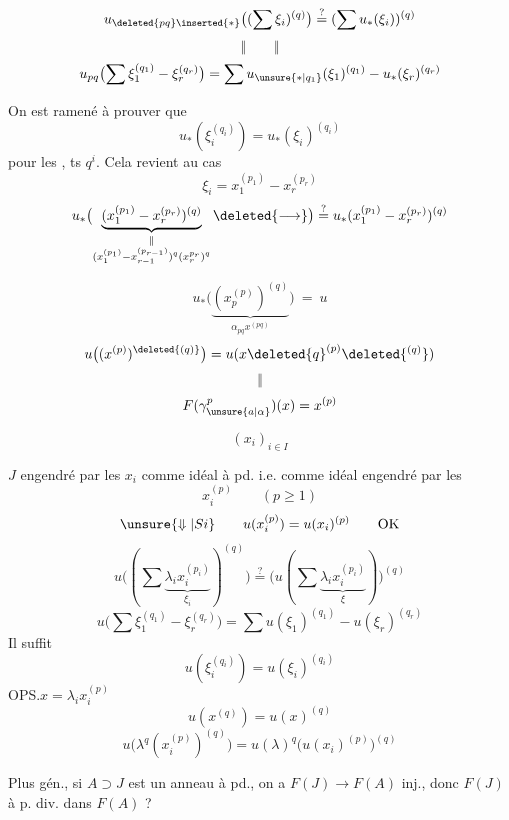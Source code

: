 
\[
u_{\deleted{pq}\inserted{*}}\bigl((\sum\xi_i)^{(q)}\bigr)
\overset{?}{=}(\sum u_*(\xi_i))^{(q)}
\]
\[\Vert\qquad\Vert\]
\[
u_{pq}\bigl(\sum\xi_1^{(q_1)}-\xi_r^{(q_r)}\bigr)
=\sum u_{\unsure{*|q_1}}(\xi_1)^{(q_1)}-u_*(\xi_r)^{(q_r)}
\]

On est ramené à prouver que
\[
u_*(\xi_i^{(q_i)})=u_*(\xi_i)^{(q_i)}
\]
pour les , ts $q^i$.
Cela revient au cas
\[
\xi_i=x_1^{(p_1)}-x_r^{(p_r)}
\]
\[
u_*\bigl(\underbrace{(x_1^{(p_1)}-x_r^{(p_r)})^{(q)}}_{\substack{\Vert\\(x_1^{(p_1)}-x_{r-1}^{(p_{r-1})})^q(x_r^{p_r})^q}}\deleted{\longrightarrow}\bigr)
\overset{?}{=}u_*(x_1^{(p_1)}-x_r^{(p_r)})^{(q)}
\]

\[
u_*\bigl(\underbrace{(x_{p}^{(p)})^{(q)}}_{\alpha_{pq}x^{(pq)}}\bigr)\ =\ u
\]
\[
u\bigl((x^{(p)})^{\deleted{(q)}}\bigr)
=u(x\deleted{q}^{(p)}\deleted{^{(q)}})
\]
\[\Vert\]
\[
F(\gamma_{\unsure{a|\alpha}}^p)(x)=x^{(p)}
\]

\[(x_i)_{i\in I}\]

$J$ engendré par les $x_i$ comme idéal à pd.
i.e. comme idéal engendré par les
\[
x_i^{(p)}\qquad(p\geq1)
\]
\[
\unsure{\Downarrow|Si}\qquad u(x_i^{(p)})=u(x_i)^{(p)}\qquad\mathrm{OK}
\]
\[
u\bigl((\sum\underbrace{\lambda_i x_i^{(p_i)}}_{\xi_i})^{(q)}\bigr)
\overset{?}{=}\bigl(u(\sum\underbrace{\lambda_i x_i^{(p_i)}}_{\xi})\bigr)^{(q)}
\]
\[
u\bigl(\sum\xi_1^{(q_1)}-\xi_r^{(q_r)}\bigr)
=\sum u(\xi_1)^{(q_1)}-u(\xi_r)^{(q_r)}
\]
Il suffit
\[
u(\xi_i^{(q_i)})=u(\xi_i)^{(q_i)}
\]
OPS.\quad $x=\lambda_i x_i^{(p)}$
\[
u(x^{(q)})=u(x)^{(q)}
\]
\[
u\bigl(\lambda^q(x_i^{(p)})^{(q)}\bigr)
=u(\lambda)^q\bigl(u(x_i)^{(p)}\bigr)^{(q)}
\]


Plus gén., si $A\supset J$ est un anneau à pd., on a $F(J)\longrightarrow F(A)$ inj., donc $F(J)$ à p. div. dans $F(A)$ ?


